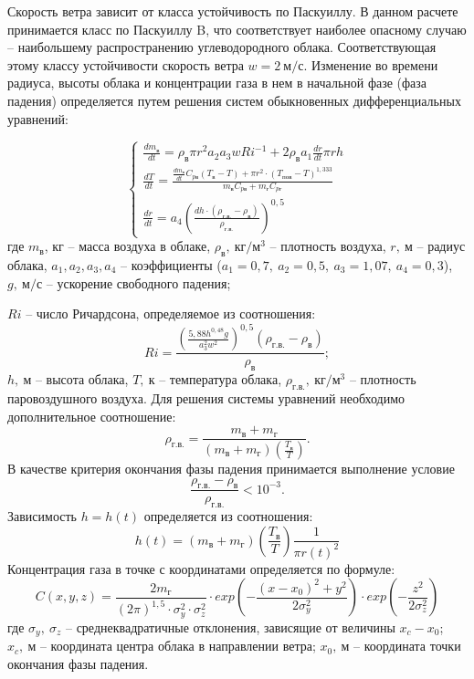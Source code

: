 Скорость ветра зависит от класса устойчивость по Паскуиллу. В данном расчете принимается класс по Паскуиллу B, что соответствует наиболее опасному случаю – наибольшему распространению углеводородного облака. Соответствующая этому классу устойчивости скорость ветра $w = 2 \ м/с$.
Изменение во времени радиуса, высоты облака и концентрации газа в нем в начальной фазе (фаза падения) определяется путем решения систем обыкновенных дифференциальных уравнений:

\[
\left\{
	\begin{array}{ll}
	  \frac{dm_в}{dt} = \rho_в \pi r^2 a_2 a_3 w Ri^{-1} + 2 \rho_в a_1 \frac{dr}{dt} \pi r h \\
	  \frac{dT}{dt} = \frac{
	  	\frac{dm_в}{dt} C_{pв} (T_в - T) + \pi r^2 \cdot (T_{пов} - T)^{1,333}
	  }{
	  	m_в C_{pв} + m_г C_{pг}
	  }\\
	  \frac{dr}{dt} = a_4 \left(
	  	\frac{
	  		dh \cdot (\rho_{г.в.} - \rho_в)
	  	}{
	  		\rho_{г.в.}	
	  	}
	  \right)^{0,5}
	\end{array}
\right.
\]
где $m_в$, кг – масса воздуха в облаке, $\rho_в, \ кг/м^3$ – плотность воздуха, $r, \ м$ – радиус облака, $a_1, a_2, a_3, a_4$ – коэффициенты ($a_1=0,7, \ a_2=0,5, \ a_3=1,07, \ a_4=0,3$), $g, \ м/с$ – ускорение свободного падения;
 
 $Ri$ – число Ричардсона, определяемое из соотношения:
$$
	Ri = \frac{
		\left(
			\frac{
				5,88h^{0,48}g
			}{
				a_3^2 w^2
			}
		\right)^{0,5}
		(\rho_{г.в.} - \rho_в)
	}{\rho_в};
$$
$h, \ м$ – высота облака, $T, \ к$ – температура облака, $\rho_{г.в.}, \ кг/м^3$ – плотность паровоздушного воздуха.
Для решения системы уравнений необходимо дополнительное соотношение:
$$
	\rho_{г.в.} = \frac{
		m_в + m_г
	}{
		\left(
			m_в + m_г
		\right)
		\left(
			\frac{T_в}{T}
		\right)
	}.
$$
В качестве критерия окончания фазы падения принимается выполнение условие
$$
	\frac{\rho_{г.в.} - \rho_в}{\rho_{г.в.}} < 10^{-3}.
$$
Зависимость $h=h(t)$ определяется из соотношения:
$$
	h(t) = \left(
		m_в + m_г
	\right)
	\left(
		\frac{T_в}{T}
	\right)
	\frac{
		1
	}{
		\pi r(t)^2
	}
$$
Концентрация газа в точке с координатами  определяется по формуле:
$$
	C(x, y, z) = \frac{
		2m_г
	}{
		(2\pi)^{1,5} \cdot \sigma_y^2 \cdot \sigma_z^2
	} \cdot 
	exp\left(
		-\frac{
			(x - x_0)^2 + y^2
		}{
			2\sigma_y^2
		}
	\right) \cdot
	exp\left(
		-\frac{
			z^2
		}{
			2\sigma_z^2
		}
	\right)
$$
где $\sigma_y, \ \sigma_z$ – среднеквадратичные отклонения, зависящие от величины $x_c - x_0$; $x_c, \ м$ – координата центра облака в направлении ветра; $x_0, \ м$ – координата точки окончания фазы падения.

